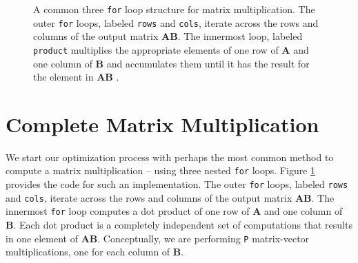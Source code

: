 \begin{figure}
{\footnotesize }
\caption{A common three \lstinline{for} loop structure for matrix multiplication. The outer \lstinline{for} loops, labeled \lstinline{rows} and \lstinline{cols}, iterate across the rows and columns of the output matrix $\mathbf{AB}$.  The innermost loop, labeled \lstinline{product} multiplies the appropriate elements of one row of $\mathbf{A}$ and one column of $\mathbf{B}$ and accumulates them until it has the result for the element in $\mathbf{AB}$ .  }
\label{fig:matrixmultiplication_sw}
\end{figure}

\section{Complete Matrix Multiplication}

We start our optimization process with perhaps the most common method to compute a matrix multiplication -- using three nested \lstinline{for} loops. Figure \ref{fig:matrixmultiplication_sw} provides the code for such an implementation.  The outer \lstinline{for} loops, labeled \lstinline{rows} and \lstinline{cols}, iterate across the rows and columns of the output matrix $\mathbf{AB}$. The innermost \lstinline{for} loop computes a dot product of one row of $\mathbf{A}$ and one column of $\mathbf{B}$. Each dot product is a completely independent set of computations that results in one element of $\mathbf{AB}$.  Conceptually, we are performing \lstinline{P} matrix-vector multiplications, one for each column of $\mathbf{B}$.


